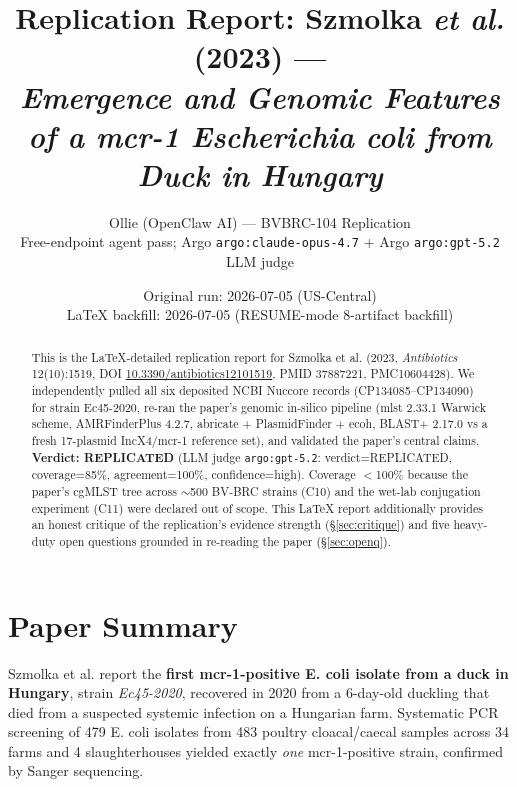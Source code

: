 \documentclass[11pt]{article}
\title{Replication Report: Szmolka \emph{et al.} (2023) --- \\
\emph{Emergence and Genomic Features of a mcr-1 Escherichia coli from Duck in Hungary}}
\author{Ollie (OpenClaw AI) --- BVBRC-104 Replication \\
Free-endpoint agent pass; Argo \texttt{argo:claude-opus-4.7} + Argo \texttt{argo:gpt-5.2} LLM judge}
\date{Original run: 2026-07-05 (US-Central) \\
LaTeX backfill: 2026-07-05 (RESUME-mode 8-artifact backfill)}
\begin{document}
\maketitle

\begin{abstract}
This is the LaTeX-detailed replication report for Szmolka et al. (2023, \emph{Antibiotics}
12(10):1519, DOI \href{https://doi.org/10.3390/antibiotics12101519}{10.3390/antibiotics12101519},
PMID 37887221, PMC10604428). We independently pulled all six deposited NCBI Nuccore records
(CP134085--CP134090) for strain Ec45-2020, re-ran the paper's genomic in-silico pipeline
(mlst 2.33.1 Warwick scheme, AMRFinderPlus 4.2.7, abricate + PlasmidFinder + ecoh,
BLAST+ 2.17.0 vs a fresh 17-plasmid IncX4/mcr-1 reference set), and validated the paper's
central claims. \textbf{Verdict: REPLICATED} (LLM judge \texttt{argo:gpt-5.2}: verdict=REPLICATED,
coverage=85\%, agreement=100\%, confidence=high). Coverage $<$100\% because the paper's cgMLST
tree across $\sim$500 BV-BRC strains (C10) and the wet-lab conjugation experiment (C11) were declared
out of scope. This LaTeX report additionally provides an honest critique of the replication's
evidence strength (\S\ref{sec:critique}) and five heavy-duty open questions grounded in re-reading
the paper (\S\ref{sec:openq}).
\end{abstract}

\section{Paper Summary}

Szmolka et al. report the \textbf{first mcr-1-positive E. coli isolate from a duck in Hungary},
strain \emph{Ec45-2020}, recovered in 2020 from a 6-day-old duckling that died from a suspected
systemic infection on a Hungarian farm. Systematic PCR screening of 479 E. coli isolates from 483
poultry cloacal/caecal samples across 34 farms and 4 slaughterhouses yielded exactly
\emph{one} mcr-1-positive strain, confirmed by Sanger sequencing.
\end{document}
